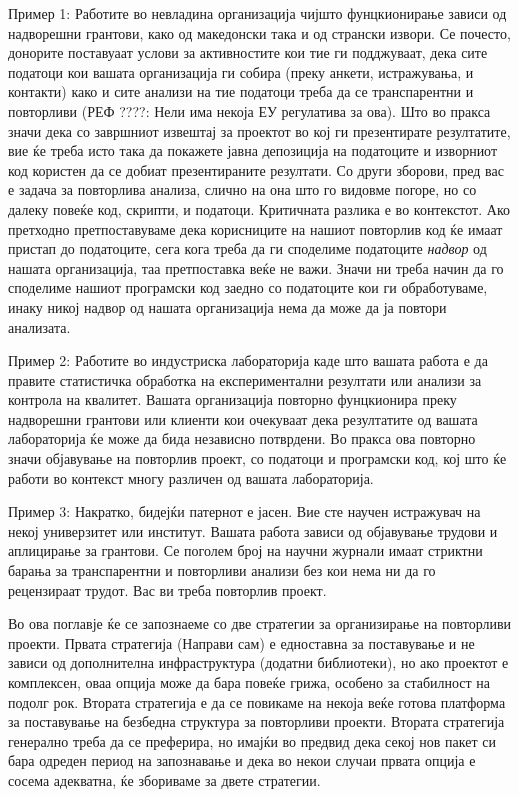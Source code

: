 \documentclass[
]{book}
\begin{document}
Пример 1: Работите во невладина организација чијшто фунцкионирање зависи од надворешни грантови, како од македонски така и од странски извори. Се почесто, донорите поставуаат услови за активностите кои тие ги подджуваат, дека сите податоци кои вашата организација ги собира (преку анкети, истражувања, и контакти) како и сите анализи на тие податоци треба да се транспарентни и повторливи (РЕФ ????: Нели има некоја ЕУ регулатива за ова). Што во пракса значи дека со завршниот извештај за проектот во кој ги презентирате резултатите, вие ќе треба исто така да покажете јавна депозиција на податоците и изворниот код користен да се добиат презентираните резултати. Со други зборови, пред вас е задача за повторлива анализа, слично на она што го видовме погоре, но со далеку повеќе код, скрипти, и податоци. Критичната разлика е во контекстот. Ако претходно претпоставуваме дека корисниците на нашиот повторлив код ќе имаат пристап до податоците, сега кога треба да ги споделиме податоците \emph{надвор} од нашата организација, таа претпоставка веќе не важи. Значи ни треба начин да го споделиме нашиот програмски код заедно со податоците кои ги обработуваме, инаку никој надвор од нашата организација нема да може да ја повтори анализата.

Пример 2: Работите во индустриска лабораторија каде што вашата работа е да правите статистичка обработка на експериментални резултати или анализи за контрола на квалитет. Вашата организација повторно фунцкионира преку надворешни грантови или клиенти кои очекуваат дека резултатите од вашата лабораторија ќе може да бида независно потврдени. Во пракса ова повторно значи објавување на повторлив проект, со податоци и програмски код, кој што ќе работи во контекст многу различен од вашата лабораторија.

Пример 3: Накратко, бидејќи патернот е јасен. Вие сте научен истражувач на некој универзитет или институт. Вашата работа зависи од објавување трудови и аплицирање за грантови. Се поголем број на научни журнали имаат стриктни барања за транспарентни и повторливи анализи без кои нема ни да го рецензираат трудот. Вас ви треба повторлив проект.

Во ова поглавје ќе се запознаеме со две стратегии за организирање на повторливи проекти. Првата стратегија (Направи сам) е едноставна за поставување и не зависи од дополнителна инфраструктура (додатни библиотеки), но ако проектот е комплексен, оваа опција може да бара повеќе грижа, особено за стабилност на подолг рок. Втората стратегија е да се повикаме на некоја веќе готова платформа за поставување на безбедна структура за повторливи проекти. Втората стратегија генерално треба да се преферира, но имајќи во предвид дека секој нов пакет си бара одреден период на запознавање и дека во некои случаи првата опција е сосема адекватна, ќе збориваме за двете стратегии.
\end{document}
